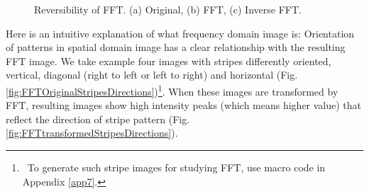 \begin{figure}[htbp]
 \centering
 \caption{ Reversibility of FFT. (a) Original, (b) FFT, (c) Inverse FFT.}
 \label{fig:FFTreversibility}
\end{figure} 

Here is an intuitive explanation of what frequency domain image is:
Orientation of patterns in spatial domain image has a clear
relationship with the resulting FFT image. We take example four images
with stripes differently oriented, vertical, diagonal (right to left or
left to right) and horizontal (Fig. \ref{fig:FFTOriginalStripesDirections})\footnote{\ To generate such stripe images for studying FFT, use macro code in Appendix \ref{app7}. }. When
these images are transformed by FFT, resulting images show high
intensity peaks (which means higher value) that reflect the direction 
of stripe pattern (Fig. \ref{fig:FFTtransformedStripesDirections}). 

